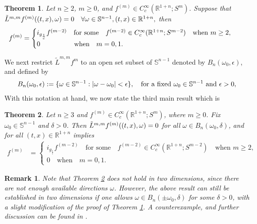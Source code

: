 \documentclass[11pt,a4paper,reqno]{amsart}
\newcommand{\qum}[1]{\quad\mbox{#1}}
\newtheorem{theorem}{Theorem}
\newtheorem{remark}[definition]{Remark}
\renewcommand{\S}{\mathbb{S}}
\newcommand{\om}{\omega}
\newcommand{\sn}{\mathbb{S}^{n-1}}
\begin{document}
	 	\begin{theorem}\label{thm_fullsph}
	 	Let $n\ge 2$, $m\geq 0$, and  $f^{(m)}\in C_{c}^{\infty}(\mathbb{R}^{1+n};S^m)$. Suppose that $	\Tilde{L}^{m,m}f^{(m)}((t,x),\omega)=0 \quad \forall \omega \in \S^{n-1}, (t,x) \in \mathbb{R}^{1+n},$
	 	then  \begin{align*}
	 		f^{(m)}&=\begin{cases}
	 			i_{g_{\frac{1}{c}}}f^{(m-2)}  \qum{for some} \quad f^{(m-2)} \in C_{c}^{\infty}(\mathbb{R}^{1+n};S^{m-2}) \qum{when $m\ge 2$,} \\
	 			0  \hspace{1.4cm}\qum{when}\quad m=0,1.
	 	\end{cases}
	 		\end{align*}
	 \end{theorem}
	We next restrict $\tilde{L}^{m,m} f^m$ to an open set subset   of $\sn$  denoted by $	B_{n}(\omega_0,\epsilon)$, and defined by 
	\begin{equation}\label{open_set_sphere}
		B_{n}(\omega_0,\epsilon) := \{ \omega \in \S^{n-1} : |\omega - \omega_0| < \epsilon\},
		\quad \mbox{for a fixed } \omega_0 \in \S^{n-1} \,\, \mbox{and $ \epsilon>0$},
	\end{equation}
	With this notation at hand, we now state the third main result which is 
	\begin{theorem}\label{thm_partsph}
		Let $n\geq 3$ and $f^{(m)}\in C_{c}^{\infty}(\mathbb{R}^{1+n};S^m)$, where $m\geq 0$. Fix $\om_0 \in\sn$ and $\delta>0$.  
		Then $\Tilde{L}^{m,m}f^{(m)}((t,x),\omega)=0$ for all $ \omega \in B_{n}(\omega_0,\delta)$, and for all $(t,x) \in \mathbb{R}^{1+n}$ implies 
		\begin{align*}
			f^{(m)}&=\begin{cases}
				i_{g_{\frac{1}{c}}}f^{(m-2)}  \qum{for some} \quad f^{(m-2)} \in C_{c}^{\infty}(\mathbb{R}^{1+n};S^{m-2}) \qum{when $m\ge 2$,} \\
				0 \qum{when}\quad m=0,1.
			\end{cases}
		\end{align*}
	\end{theorem}
	\begin{remark}
	Note that Theorem \ref{thm_partsph} does not hold in two dimensions, since there are not enough available directions $\omega$. However, the above result can still be established in two dimensions if one allows $\omega \in B_n(\pm \omega_0, \delta)$ for some $\delta>0$, with a slight modification of the proof of Theorem \ref{thm_fullsph}.  A counterexample, and further discussion can be found in \cite[Theorem 2.1]{siamak_vector_field_lrt}.
\end{remark}
\end{document}

